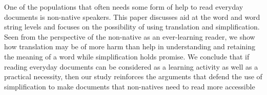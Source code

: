 One of the populations that often needs some form of help to read everyday documents is
 non-native speakers. This paper discusses aid
 at the word and word string levels and focuses
 on the possibility of using translation and
 simplification. Seen from the perspective of
 the non-native as an ever-learning reader, we
 show how translation may be of more harm
 than help in understanding and retaining the
 meaning of a word while simplification holds
 promise. We conclude that if reading everyday
 documents can be considered as a learning
 activity as well as a practical necessity,
 then our study reinforces the arguments that
 defend the use of simplification to make documents
 that non-natives need to read more accessible

